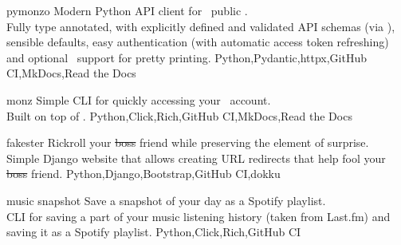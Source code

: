 \documentclass[localFont,alternative,10pt]{yaac-another-awesome-cv}
\begin{document}
  \vspace{0.5em}


  \begin{projects}
    \project
      {pymonzo}{}
      { }
      {
        Modern Python API client for ~public . \\
        Fully type annotated, with explicitly defined and validated API schemas (via ),
        sensible defaults, easy authentication (with automatic access token refreshing)
        and optional ~support for pretty printing.
      }
      {Python,Pydantic,httpx,GitHub CI,MkDocs,Read the Docs}

    \project
      {monz}{}
      { }
      {
        Simple CLI for quickly accessing your ~account. \\
        Built on top of .
      }
      {Python,Click,Rich,GitHub CI,MkDocs,Read the Docs}

    \project
      {fakester}{}
      { }
      {
        Rickroll your \sout{boss} friend while preserving the element of surprise. \\
        Simple Django website that allows creating URL redirects that help fool your \sout{boss} friend.
      }
      {Python,Django,Bootstrap,GitHub CI,dokku}

    \project
      {music snapshot}{}
      {}
      {
        Save a snapshot of your day as a Spotify playlist. \\
        CLI for saving a part of your music listening history (taken from Last.fm) and
        saving it as a Spotify playlist.
      }
      {Python,Click,Rich,GitHub CI}
  \end{projects}
\end{document}
